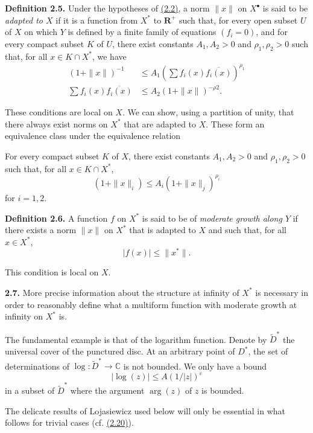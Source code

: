 \documentclass{report}
\newenvironment{itenv*}
  {\phantomsection\par\medskip\noindent\itshape}
  {\medskip}
\newenvironment{rmenv}[1]
  {\phantomsection\par\medskip\noindent\textbf{#1.}\rmfamily}
  {\medskip}
\newcommand{\CC}{\mathbb{C}}
\newcommand{\RR}{\mathbf{R}}
\renewcommand{\leq}{\leqslant}
\newcommand{\oldpage}[1]{\marginpar{\footnotesize$\Big\vert$ \textit{p.~#1}}}
\begin{document}
\begin{rmenv}{Definition 2.5}
\label{II.2.5}
  Under the hypotheses of \hyperref[II.2.2]{(2.2)}, a norm $\|x\|$ on $X^\bullet$ is said to be \emph{adapted to $X$} if it is a function from $X^*$ to $\RR^+$ such that, for every open subset $U$ of $X$ on which $Y$ is defined by a finite family of equations $(f_i=0)$, and for every compact subset $K$ of $U$, there exist constants $A_1,A_2>0$ and $\rho_1,\rho_2>0$ such that, for all $x\in K\cap X^*$, we have
  \[
    \begin{aligned}
      (1+\|x\|)^{-1}
      &\leq A_1\left(\sum f_i(x)\overline{f_i(x)}\right)^{\rho_1}
    \\\sum f_i(x)\overline{f_i(x)}
      &\leq A_2(1+\|x\|)^{-\rho2}.
    \end{aligned}
  \]

  \oldpage{63}
  These conditions are local on $X$.
  We can show, using a partition of unity, that there always exist norms on $X^*$ that are adapted to $X$.
  These form an equivalence class under the equivalence relation

  \begin{itenv*}
  \label{II.2.5.*'M}
    For every compact subset $K$ of $X$, there exist constants $A_1,A_2>0$ and $\rho_1,\rho_2>0$ such that, for all $x\in K\cap X^*$,
    \[
      (1+\|x\|_i) \leq A_i(1+\|x\|_j)^{\rho_i}
    \tag{$*'$M}
    \]
    for $i=1,2$.
  \end{itenv*}
\end{rmenv}

\begin{rmenv}{Definition 2.6}
\label{II.2.6}
  A function $f$ on $X^*$ is said to be of \emph{moderate growth along $Y$} if there exists a norm $\|x\|$ on $X^*$ that is adapted to $X$ and such that, for all $x\in X^*$,
  \[
    |f(x)| \leq \|x^*\|.
  \]

  This condition is local on $X$.
\end{rmenv}

\begin{rmenv}{2.7}
\label{II.2.7}
  More precise information about the structure at infinity of $X^*$ is necessary in order to reasonably define what a multiform function with moderate growth at infinity on $X^*$ is.

  The fundamental example is that of the logarithm function.
  Denote by $\widetilde{D}^*$ the universal cover of the punctured disc.
  At an arbitrary point of $D^*$, the set of determinations of $\log\colon\widetilde{D}^*\to\CC$ is not bounded.
  We only have a bound
  \[
    |\log(z)| \leq A(1/|z|)^\varepsilon
  \]
  in a subset of $\widetilde{D}^*$ where the argument $\arg(z)$ of $z$ is bounded.

  The delicate results of Lojasiewicz used below will only be essential in what follows for trivial cases (cf. \hyperref[II.2.20]{(2.20)}).
\end{rmenv}
\end{document}
